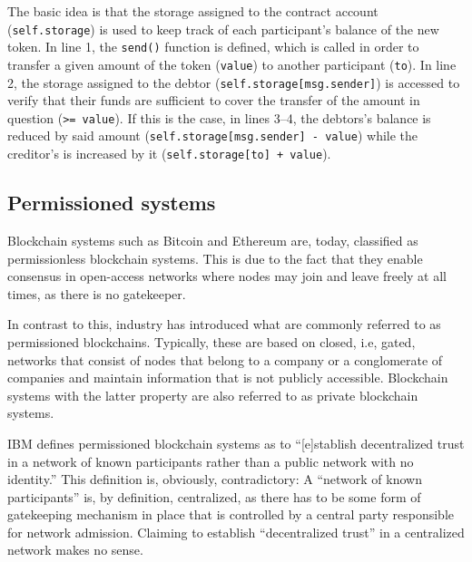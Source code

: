 
The basic idea is that the storage assigned to the contract account (\texttt{self.storage}) is used to keep track of each participant's balance of the new token.
In line 1, the \texttt{send()} function is defined, which is called in order to transfer a given amount of the token (\texttt{value}) to another participant (\texttt{to}).
In line 2, the storage assigned to the debtor (\texttt{self.storage[msg.sender]}) is accessed to verify that their funds are sufficient to cover the transfer of the amount in question (\texttt{>= value}).
If this is the case, in lines 3--4, the debtors's balance is reduced by said amount (\texttt{self.storage[msg.sender] - value}) while the creditor's is increased by it (\texttt{self.storage[to] + value}).

\subsection{Permissioned systems}

Blockchain systems such as Bitcoin and Ethereum are, today, classified as permissionless blockchain systems.
This is due to the fact that they enable consensus in open-access networks where nodes may join and leave freely at all times, as there is no gatekeeper.

In contrast to this, industry has introduced what are commonly referred to as permissioned blockchains.
Typically, these are based on closed, i.e, gated, networks that consist of nodes that belong to a company or a conglomerate of companies and maintain information that is not publicly accessible.
Blockchain systems with the latter property are also referred to as private blockchain systems.

IBM defines permissioned blockchain systems as to ``[e]stablish decentralized trust in a network of known participants rather than a public network with no identity.'' \autocite{ibm2021hyperledger}
This definition is, obviously, contradictory:
A ``network of known participants'' is, by definition, centralized, as there has to be some form of gatekeeping mechanism in place that is controlled by a central party responsible for network admission.
Claiming to establish ``decentralized trust'' in a centralized network makes no sense.

